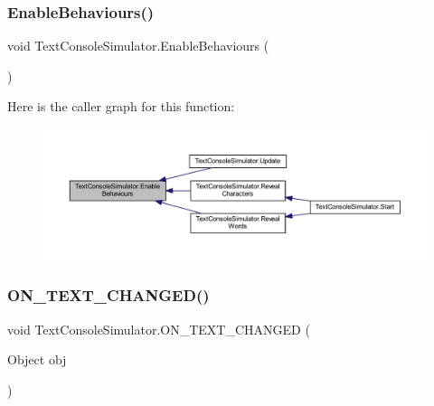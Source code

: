 \subsubsection{\texorpdfstring{Enable\+Behaviours()}{EnableBehaviours()}}
{\footnotesize\ttfamily void Text\+Console\+Simulator.\+Enable\+Behaviours (\begin{DoxyParamCaption}{ }\end{DoxyParamCaption})\hspace{0.3cm}{\ttfamily [private]}}

Here is the caller graph for this function\+:
\nopagebreak
\begin{figure}[H]
\begin{center}
\leavevmode
\includegraphics[width=350pt]{class_text_console_simulator_a00f1a84f3b64fdc61d2b5dc4ec22b8b5_icgraph}
\end{center}
\end{figure}
\mbox{\label{class_text_console_simulator_adcb9117e3ef855ea84c1d5cea9c40e0f}} 
\subsubsection{\texorpdfstring{O\+N\+\_\+\+T\+E\+X\+T\+\_\+\+C\+H\+A\+N\+G\+E\+D()}{ON\_TEXT\_CHANGED()}}
{\footnotesize\ttfamily void Text\+Console\+Simulator.\+O\+N\+\_\+\+T\+E\+X\+T\+\_\+\+C\+H\+A\+N\+G\+ED (\begin{DoxyParamCaption}\item[{Object}]{obj }\end{DoxyParamCaption})\hspace{0.3cm}{\ttfamily [private]}}

